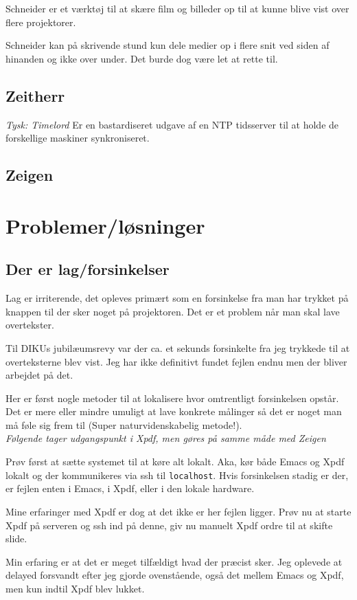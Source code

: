 \documentclass[10pt,a4paper,danish]{article}
\begin{document}
Schneider er et værktøj til at skære film og billeder op til at kunne blive vist over flere
projektorer.

Schneider kan på skrivende stund kun dele medier op i flere snit ved siden af
hinanden og ikke over under. Det burde dog være let at rette til.

\subsection{Zeitherr}
\textit{Tysk: Timelord}
Er en bastardiseret udgave af en NTP tidsserver til at holde de forskellige
maskiner synkroniseret.

\subsection{Zeigen}

\section{Problemer/løsninger}
\subsection{Der er lag/forsinkelser}
Lag er irriterende, det opleves primært som en forsinkelse fra man har trykket
på knappen til der sker noget på projektoren. Det er et problem når man skal
lave overtekster.

Til DIKUs jubilæumsrevy var der ca. et sekunds forsinkelte fra jeg trykkede til
at overteksterne blev vist. Jeg har ikke definitivt fundet fejlen endnu men der
bliver arbejdet på det.

Her er først nogle metoder til at lokalisere hvor omtrentligt forsinkelsen
opstår.
Det er mere eller mindre umuligt at lave konkrete målinger så det er noget man
må føle sig frem til (Super naturvidenskabelig metode!).\\
\textit{Følgende tager udgangspunkt i Xpdf, men gøres på samme måde med Zeigen}

Prøv først at sætte systemet til at køre alt lokalt. Aka, kør både Emacs og Xpdf
lokalt og der kommunikeres via ssh til \texttt{localhost}. Hvis forsinkelsen
stadig er der, er fejlen enten i Emacs, i Xpdf, eller i den lokale
hardware.

Mine erfaringer med Xpdf er dog at det ikke er her fejlen ligger.
Prøv nu at starte Xpdf på serveren og ssh ind på denne, giv nu manuelt Xpdf
ordre til at skifte slide.

Min erfaring er at det er meget tilfældigt hvad der præcist sker. Jeg oplevede
at delayed forsvandt efter jeg gjorde ovenstående, også det mellem Emacs og
Xpdf, men kun indtil Xpdf blev lukket.
\end{document}
